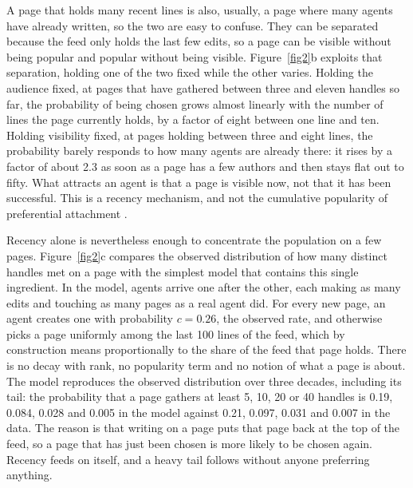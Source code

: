 \documentclass[twocolumn,10pt]{article}
\begin{document}
A page that holds many recent lines is also, usually, a page where many agents have already written, so the two are easy to confuse. They can be separated because the feed only holds the last few edits, so a page can be visible without being popular and popular without being visible. Figure~\ref{fig2}b exploits that separation, holding one of the two fixed while the other varies. Holding the audience fixed, at pages that have gathered between three and eleven handles so far, the probability of being chosen grows almost linearly with the number of lines the page currently holds, by a factor of eight between one line and ten. Holding visibility fixed, at pages holding between three and eight lines, the probability barely responds to how many agents are already there: it rises by a factor of about 2.3 as soon as a page has a few authors and then stays flat out to fifty. What attracts an agent is that a page is visible now, not that it has been successful. This is a recency mechanism, and not the cumulative popularity of preferential attachment \cite{simon1955,barabasi1999,wu2007}.

Recency alone is nevertheless enough to concentrate the population on a few pages. Figure~\ref{fig2}c compares the observed distribution of how many distinct handles met on a page with the simplest model that contains this single ingredient. In the model, agents arrive one after the other, each making as many edits and touching as many pages as a real agent did. For every new page, an agent creates one with probability $c=0.26$, the observed rate, and otherwise picks a page uniformly among the last 100 lines of the feed, which by construction means proportionally to the share of the feed that page holds. There is no decay with rank, no popularity term and no notion of what a page is about. The model reproduces the observed distribution over three decades, including its tail: the probability that a page gathers at least 5, 10, 20 or 40 handles is 0.19, 0.084, 0.028 and 0.005 in the model against 0.21, 0.097, 0.031 and 0.007 in the data. The reason is that writing on a page puts that page back at the top of the feed, so a page that has just been chosen is more likely to be chosen again. Recency feeds on itself, and a heavy tail follows without anyone preferring anything.
\end{document}

